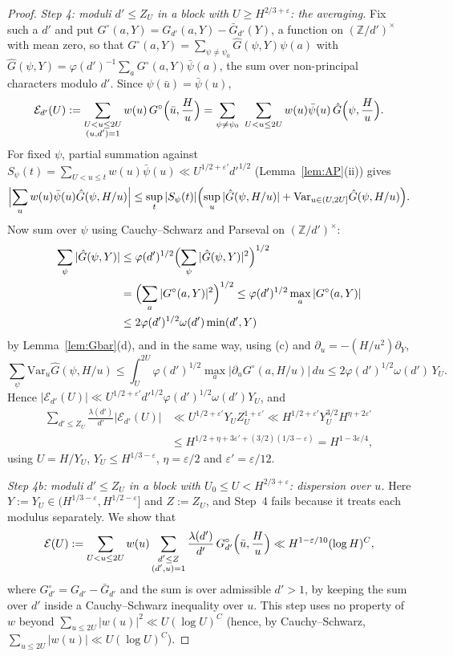 \documentclass[11pt,a4paper]{article}
\theoremstyle{remark}\newtheorem{remark}[theorem]{Remark}
\newcommand{\Z}{\mathbb{Z}}\newcommand{\Q}{\mathbb{Q}}\newcommand{\F}{\mathbb{F}}\newcommand{\R}{\mathbb{R}}
\begin{document}
\begin{proof}
\emph{Step 4: moduli $d'\le Z_U$ in a block with $U\ge H^{2/3+\varepsilon}$: the averaging.} Fix such a $d'$ and put $G^\circ(a,Y)=G_{d'}(a,Y)-\bar G_{d'}(Y)$,
a function on $(\Z/d')^\times$ with mean zero, so that $G^\circ(a,Y)=\sum_{\psi\ne\psi_0}\hat G(\psi,Y)\psi(a)$ with
$\hat G(\psi,Y)=\varphi(d')^{-1}\sum_aG^\circ(a,Y)\bar\psi(a)$, the sum over non-principal characters modulo $d'$. Since
$\psi(\bar u)=\bar\psi(u)$,
\[
\mathcal E_{d'}(U):=\sum_{\substack{U<u\le2U\\ (u,d')=1}}w(u)\,G^\circ\Bigl(\bar u,\frac Hu\Bigr)=\sum_{\psi\ne\psi_0}\ \sum_{U<u\le2U}w(u)\bar\psi(u)\,\hat G\Bigl(\psi,\frac Hu\Bigr).
\]
For fixed $\psi$, partial summation against $S_\psi(t)=\sum_{U<u\le t}w(u)\bar\psi(u)\ll U^{1/2+\varepsilon'}d'^{1/2}$
(Lemma~\ref{lem:AP}(ii)) gives
\[
\Bigl|\sum_uw(u)\bar\psi(u)\hat G(\psi,H/u)\Bigr|\le\sup_t|S_\psi(t)|\Bigl(\sup_u|\hat G(\psi,H/u)|+\mathrm{Var}_{u\in(U,2U]}\hat G(\psi,H/u)\Bigr).
\]
Now sum over $\psi$ using Cauchy--Schwarz and Parseval on $(\Z/d')^\times$:
\[
\begin{aligned}
\sum_\psi|\hat G(\psi,Y)|&\le\varphi(d')^{1/2}\Bigl(\sum_\psi|\hat G(\psi,Y)|^2\Bigr)^{1/2}\\
&=\Bigl(\sum_a|G^\circ(a,Y)|^2\Bigr)^{1/2}\le\varphi(d')^{1/2}\max_a|G^\circ(a,Y)|\\
&\le2\varphi(d')^{1/2}\omega(d')\min(d',Y)
\end{aligned}
\]
by Lemma~\ref{lem:Gbar}(d), and in the same way, using (c) and $\partial_u=-(H/u^2)\partial_Y$,
\[
\sum_\psi\mathrm{Var}_u\hat G(\psi,H/u)\le\int_U^{2U}\varphi(d')^{1/2}\max_a|\partial_uG^\circ(a,H/u)|\,du\le2\varphi(d')^{1/2}\omega(d')\,Y_U.
\]
Hence $|\mathcal E_{d'}(U)|\ll U^{1/2+\varepsilon'}d'^{1/2}\varphi(d')^{1/2}\omega(d')Y_U$, and
\[
\begin{aligned}
\sum_{d'\le Z_U}\frac{\lambda(d')}{d'}|\mathcal E_{d'}(U)|&\ll U^{1/2+\varepsilon'}Y_UZ_U^{1+\varepsilon'}\ll H^{1/2+\varepsilon'}Y_U^{3/2}H^{\eta+2\varepsilon'}\\
&\le H^{1/2+\eta+3\varepsilon'+(3/2)(1/3-\varepsilon)}=H^{1-3\varepsilon/4},
\end{aligned}
\]
using $U=H/Y_U$, $Y_U\le H^{1/3-\varepsilon}$, $\eta=\varepsilon/2$ and $\varepsilon'=\varepsilon/12$.

\emph{Step 4b: moduli $d'\le Z_U$ in a block with $U_0\le U<H^{2/3+\varepsilon}$: dispersion over $u$.} Here $Y:=Y_U\in(H^{1/3-\varepsilon},H^{1/2-\varepsilon}]$
and $Z:=Z_U$, and Step~4 fails because it treats each modulus separately. We show that
\[
\mathcal E(U):=\sum_{U<u\le2U}w(u)\sum_{\substack{d'\le Z\\ (d',u)=1}}\frac{\lambda(d')}{d'}\,G^\circ_{d'}\Bigl(\bar u,\frac Hu\Bigr)\ll H^{1-\varepsilon/10}(\log H)^C,
\]
where $G^\circ_{d'}=G_{d'}-\bar G_{d'}$ and the sum is over admissible $d'>1$, by keeping the sum over $d'$ inside a
Cauchy--Schwarz inequality over $u$. This step uses no property of $w$ beyond $\sum_{u\le2U}|w(u)|^2\ll U(\log U)^C$ (hence, by Cauchy--Schwarz, $\sum_{u\le2U}|w(u)|\ll U(\log U)^C$).


\end{proof}
\end{document}
